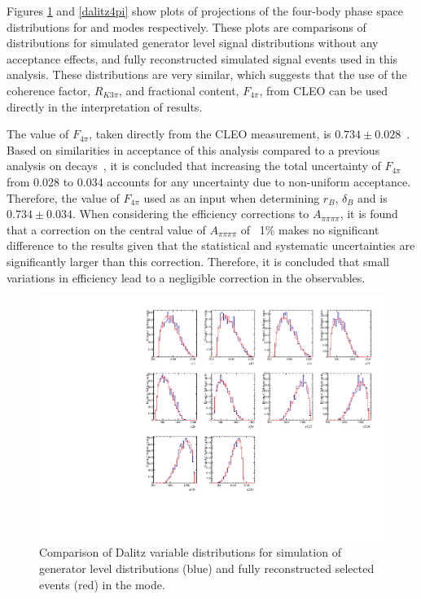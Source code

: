 Figures \ref{dalitzk3pi} and \ref{dalitz4pi} show plots of projections of the four-body phase space distributions for \kpipipi and \pipipipi modes respectively. These plots are comparisons of distributions for simulated generator level signal distributions without any acceptance effects, and fully reconstructed simulated signal events used in this analysis. These distributions are very similar, which suggests that the use of the \kpipipi coherence factor, $R_{K3\pi}$, and fractional \CP content, $F_{4\pi}$, from CLEO can be used directly in the interpretation of \lhcb results. 

The value of $F_{4\pi}$, taken directly from the CLEO measurement, is $0.734 \pm 0.028$~\cite{charm4pi}. Based on similarities in acceptance of this analysis compared to a previous \lhcb analysis on \decay{\Bm}{\D\Km} decays~\cite{B2DK_ADSGLW}, it is concluded that increasing the total uncertainty of $F_{4\pi}$ from 0.028 to 0.034 accounts for any uncertainty due to non-uniform \lhcb acceptance. Therefore, the value of $F_{4\pi}$ used as an input when determining $r_B$, $\delta_B$ and \Pgamma is $0.734 \pm 0.034$. When considering the efficiency corrections to $A_{\pi\pi\pi\pi}$, it is found that a correction on the central value of $A_{\pi\pi\pi\pi}$ of ~1\% makes no significant difference to the results given that the statistical and systematic uncertainties are significantly larger than this correction. Therefore, it is concluded that small variations in efficiency lead to a negligible correction in the observables. 

\begin{figure}[h]
\centering
\includegraphics[width=0.8\linewidth]{figures/results/dalitzDist_KPiPiPi.pdf}
\caption{Comparison of Dalitz variable distributions for simulation of generator level distributions (blue) and fully reconstructed selected events (red) in the \kpipipi mode.}
\label{dalitzk3pi}
\end{figure}

